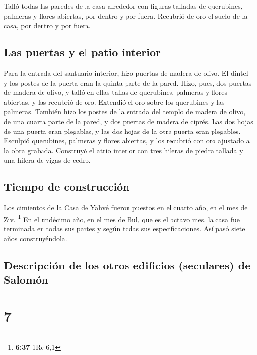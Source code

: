  Talló todas las paredes de la casa alrededor con figuras
talladas de querubines, palmeras y flores abiertas, por dentro y por
fuera.  Recubrió de oro el suelo de la casa, por dentro y
por fuera.

\hypertarget{las-puertas-y-el-patio-interior}{%
\subsection{Las puertas y el patio
interior}\label{las-puertas-y-el-patio-interior}}

 Para la entrada del santuario interior, hizo puertas de
madera de olivo. El dintel y los postes de la puerta eran la quinta
parte de la pared.  Hizo, pues, dos puertas de madera de
olivo, y talló en ellas tallas de querubines, palmeras y flores
abiertas, y las recubrió de oro. Extendió el oro sobre los querubines y
las palmeras.  También hizo los postes de la entrada del
templo de madera de olivo, de una cuarta parte de la pared,
 y dos puertas de madera de ciprés. Las dos hojas de una
puerta eran plegables, y las dos hojas de la otra puerta eran plegables.
 Esculpió querubines, palmeras y flores abiertas, y los
recubrió con oro ajustado a la obra grabada.  Construyó
el atrio interior con tres hileras de piedra tallada y una hilera de
vigas de cedro.

\hypertarget{tiempo-de-construcciuxf3n}{%
\subsection{Tiempo de construcción}\label{tiempo-de-construcciuxf3n}}

 Los cimientos de la Casa de Yahvé fueron puestos en el
cuarto año, en el mes de Ziv. \footnote{\textbf{6:37} 1Re 6,1}
 En el undécimo año, en el mes de Bul, que es el octavo
mes, la casa fue terminada en todas sus partes y según todas sus
especificaciones. Así pasó siete años construyéndola.

\hypertarget{descripciuxf3n-de-los-otros-edificios-seculares-de-salomuxf3n}{%
\subsection{Descripción de los otros edificios (seculares) de
Salomón}\label{descripciuxf3n-de-los-otros-edificios-seculares-de-salomuxf3n}}

\hypertarget{section-6}{%
\section{7}\label{section-6}}

